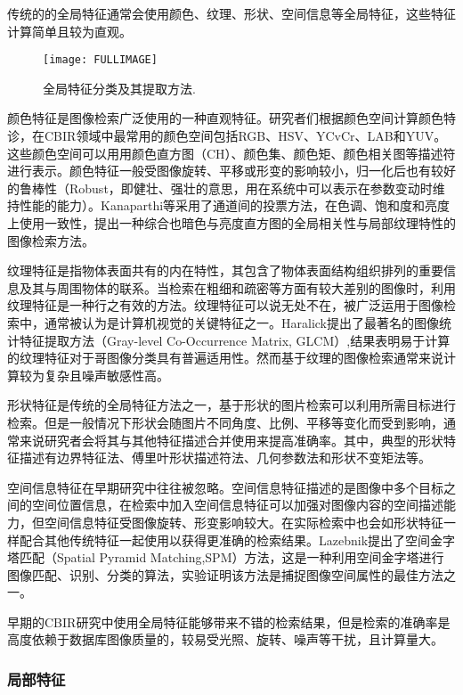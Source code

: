 \documentclass[bachelor_p]{hdu-thesis}
\begin{document}
传统的的全局特征通常会使用颜色、纹理、形状、空间信息等全局特征，这些特征计算简单且较为直观。

\begin{figure}[!htb]
  \centering
  \texttt{[image: FULLIMAGE]}
  \caption{全局特征分类及其提取方法.}
  \label{fig_FULLIMAGE}
\end{figure}

颜色特征是图像检索广泛使用的一种直观特征。研究者们根据颜色空间计算颜色特诊，在CBIR领域中最常用的颜色空间包括RGB、HSV、YCvCr、LAB和YUV。这些颜色空间可以用用颜色直方图（CH）、颜色集、颜色矩、颜色相关图等描述符进行表示\citep{CBIRSHORT}。颜色特征一般受图像旋转、平移或形变的影响较小，归一化后也有较好的鲁棒性（Robust，即健壮、强壮的意思，用在系统中可以表示在参数变动时维持性能的能力）。Kanaparthi等\citep{COLORINTERGRATE}采用了通道间的投票方法，在色调、饱和度和亮度上使用一致性，提出一种综合也暗色与亮度直方图的全局相关性与局部纹理特性的图像检索方法。

纹理特征是指物体表面共有的内在特性，其包含了物体表面结构组织排列的重要信息及其与周围物体的联系。当检索在粗细和疏密等方面有较大差别的图像时，利用纹理特征是一种行之有效的方法。纹理特征可以说无处不在，被广泛运用于图像检索中，通常被认为是计算机视觉的关键特征之一。Haralick\citep{HARALICK}提出了最著名的图像统计特征提取方法（Gray-level Co-Occurrence Matrix, GLCM）,结果表明易于计算的纹理特征对于哥图像分类具有普遍适用性。然而基于纹理的图像检索通常来说计算较为复杂且噪声敏感性高\citep{AAN}。

形状特征是传统的全局特征方法之一，基于形状的图片检索可以利用所需目标进行检索。但是一般情况下形状会随图片不同角度、比例、平移等变化而受到影响，通常来说研究者会将其与其他特征描述合并使用来提高准确率。其中，典型的形状特征描述有边界特征法、傅里叶形状描述符法、几何参数法和形状不变矩法等。

空间信息特征在早期研究中往往被忽略。空间信息特征描述的是图像中多个目标之间的空间位置信息，在检索中加入空间信息特征可以加强对图像内容的空间描述能力，但空间信息特征受图像旋转、形变影响较大。在实际检索中也会如形状特征一样配合其他传统特征一起使用以获得更准确的检索结果。Lazebnik\citep{LAZEBNIK}提出了空间金字塔匹配（Spatial Pyramid Matching,SPM）方法，这是一种利用空间金字塔进行图像匹配、识别、分类的算法，实验证明该方法是捕捉图像空间属性的最佳方法之一。

早期的CBIR研究中使用全局特征能够带来不错的检索结果，但是检索的准确率是高度依赖于数据库图像质量的，较易受光照、旋转、噪声等干扰，且计算量大。

\subsubsection{局部特征}
\end{document}
